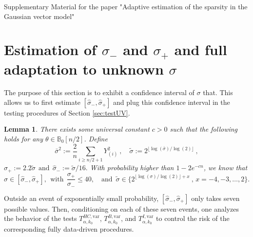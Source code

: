 \documentclass[twoside,11pt]{article}
\newtheorem{lem}{Lemma}
\def\bbB{\mathbb{B}}
\newcommand{\<}{\langle}
\renewcommand{\>}{\rangle}
\begin{document}


 




\pagebreak








\appendix 

\begin{center}
\noindent
{\huge Supplementary Material for the paper "Adaptive estimation of the sparsity in the Gaussian vector model"}
\bigskip


\end{center}

\bigskip
\bigskip


\section{Estimation of $\sigma_-$ and $\sigma_+$ and full adaptation to unknown $\sigma$}\label{sec:appendix_estimation_sigma}


The purpose of this section is to exhibit a confidence interval of $\sigma$ that. This allows us to first estimate $[\hat{\sigma}_-,\hat{\sigma}_+]$ and plug this confidence interval in the testing procedures of Section \ref{sec:testUV}. 




\begin{lem}\label{lem:calcsig}
There exists some universal constant $c>0$ such that the following holds for any $\theta \in \bbB_0[n/2]$. Define 
$$\bar \sigma^2 := \frac{2}{n} \sum_{i\geq n/2+1} Y_{(i)}^2\ ,\quad \tilde \sigma := 2^{\lfloor \log(\bar \sigma)/\log(2) \rfloor}\ ,$$  $\hat{\sigma}_+ :=  2.2\tilde \sigma ~~\text{and}~~\hat{\sigma}_- := \tilde \sigma /16.$
With probability higher than $1- 2e^{-cn}$, we know that 
$$\sigma \in [\hat{\sigma}_-, \hat{\sigma}_+],~~\text{with}~~\frac{\sigma_+}{\sigma_-}\leq 40,\quad\text{and }\,
 \tilde \sigma \in \Big\{2^{\lfloor \log( \sigma)/\log(2)\rfloor+x}\ ,\, x= -4,-3,\ldots ,2\Big\}.$$
\end{lem}
Outside an event of exponentially small probability, $[\hat{\sigma}_-,\hat{\sigma}_+]$ only takes seven possible values. Then, conditioning on each of these seven events, one analyzes the behavior of the tests $T_{\alpha,k_0}^{HC,\mathrm{var}}$, $T_{\alpha,k_0}^{B,\mathrm{var}}$, and $T_{\alpha,k_0}^{I,\mathrm{var}}$ to control the risk of the corresponding fully data-driven procedures.
\end{document}
